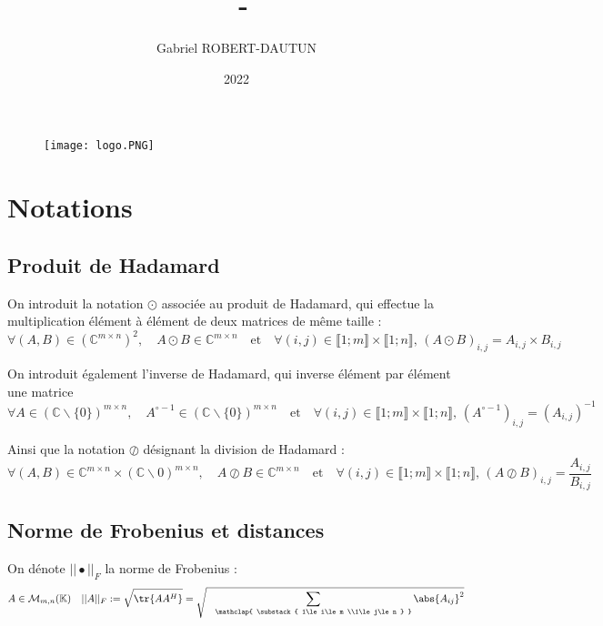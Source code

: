 \documentclass[titlepage]{article}
\author{Gabriel ROBERT-DAUTUN}
\date{2022}
\title{%
	\UE\, - \type\ifthenelse{\nb > 0}{\nb}{} \\
	\large \sbt}
\newcommand{\hinv}[1]{#1^{\circ-1}} %
\newcommand{\fnorm}[1]{|\vert#1|\vert_{F}} %
\begin{document}
	
	\begin{figure}
		\centering
		\texttt{[image: logo.PNG]}
		\label{fig:logo}
	\end{figure}
	\maketitle
	
	\newpage
	\tableofcontents
	
	\newpage
	\section{Notations}
	\subsection{Produit de Hadamard}
	
	On introduit la notation $\odot$ associée au produit de Hadamard, qui effectue la multiplication élément à élément de deux matrices de même taille :
	$$
	\forall (A,B)\in\left(\mathbb{C}^{m\times n}\right)^2, \quad A\odot B\in\mathbb{C}^{m\times n} \quad\text{et}\quad \forall (i,j)\in\llbracket1;m\rrbracket\times\llbracket1;n\rrbracket,\, (A\odot B)_{i,j} = A_{i,j}\times B_{i,j}
	$$
	
	On introduit également l'inverse de Hadamard, qui inverse élément par élément une matrice
	$$
		\forall A \in \left(\mathbb{C}\backslash\{0\}\right)^{m\times n},\quad \hinv{A}\in\left(\mathbb{C}\backslash\{0\}\right)^{m\times n} \quad\text{et}\quad \forall (i,j)\in\llbracket1;m\rrbracket\times\llbracket1;n\rrbracket,\, \left(\hinv{A}\right)_{i,j} = \left(A_{i,j}\right)^{-1}
	$$ 
	
	Ainsi que la notation $\oslash$ désignant la division de Hadamard :
		$$
	\forall (A,B)\in\mathbb{C}^{m\times n}\times\left(\mathbb{C}\backslash0\right)^{m\times n}, \quad A\oslash B\in\mathbb{C}^{m\times n} \quad\text{et}\quad \forall (i,j)\in\llbracket1;m\rrbracket\times\llbracket1;n\rrbracket,\, (A\oslash B)_{i,j} = \frac{A_{i,j}}{B_{i,j}}
	$$
	
	\subsection{Norme de Frobenius et distances}
	
	On dénote $\fnorm{\bullet}$ la norme de Frobenius :
	$$
		A\in\mathcal{M}_{m,n}(\mathbb{K}) \quad \fnorm{A} := \sqrt{\tr{AA^H}} = \sqrt{
				\;\;\;\sum_{
					\mathclap{
						\substack{
							1\le i\le m \\1\le j\le n
						}
					}
				}\abs{A_{ij}}^2}
	$$
	
\end{document}
